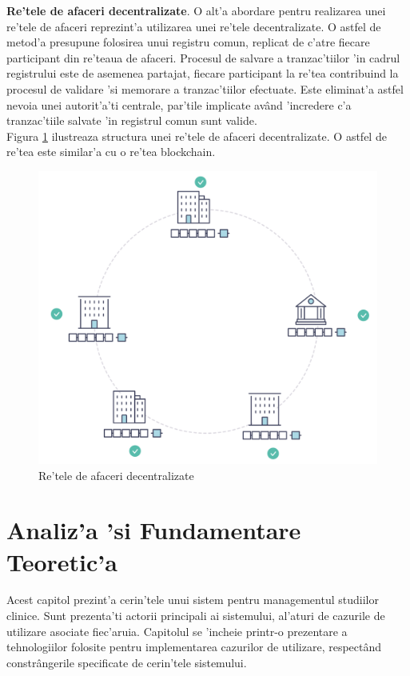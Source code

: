 \documentclass[12pt,a4paper,twoside]{report}
\begin{document}
\textbf{Re'tele de afaceri decentralizate}. O alt'a abordare pentru realizarea unei re'tele de afaceri reprezint'a utilizarea unei re'tele decentralizate. O astfel de metod'a presupune folosirea unui registru comun, replicat de c'atre fiecare participant din re'teaua de afaceri. Procesul de salvare a tranzac'tiilor 'in cadrul registrului este de asemenea partajat, fiecare participant la re'tea contribuind la procesul de validare 'si memorare a tranzac'tiilor efectuate. Este eliminat'a astfel nevoia unei autorit'a'ti centrale, par'tile implicate av\^and 'incredere c'a tranzac'tiile salvate 'in registrul comun sunt valide. \\
Figura \ref{fig:decentralised} ilustreaza structura unei re'tele de afaceri decentralizate. O astfel de re'tea este similar'a cu o re'tea blockchain.
		\begin{figure}[H]
		\begin{center}
			\includegraphics[scale=0.3]{img/future_net.png}
			\caption{Re'tele de afaceri decentralizate\cite{fabricdoc}}
  			\label{fig:decentralised}
  		\end{center}
  		\end{figure}
  		

\chapter{Analiz'a 'si Fundamentare Teoretic'a}
\label{ch:analysis}
Acest capitol prezint'a cerin'tele unui sistem pentru managementul studiilor clinice. Sunt prezenta'ti actorii principali ai sistemului, al'aturi de cazurile de utilizare asociate fiec'aruia. Capitolul se 'incheie printr-o prezentare a tehnologiilor folosite pentru implementarea cazurilor de utilizare, respect\^and constr\^angerile specificate de cerin'tele sistemului.
\end{document}
